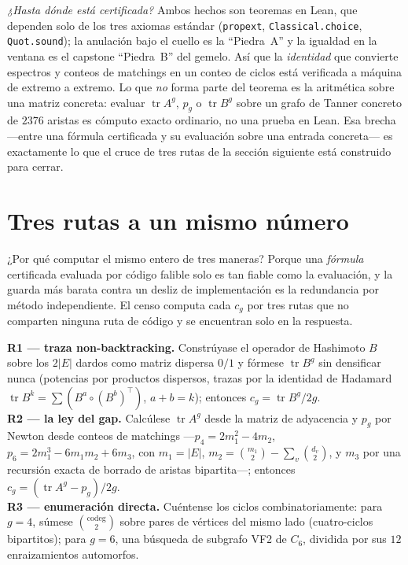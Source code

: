 \documentclass[11pt]{article}
\newcommand{\lean}[1]{\texttt{#1}}
\DeclareMathOperator{\tr}{tr}
\begin{document}
\emph{¿Hasta dónde está certificada?} Ambos hechos son teoremas en Lean, que dependen solo de
los tres axiomas estándar (\lean{propext}, \lean{Classical.choice}, \lean{Quot.sound}); la
anulación bajo el cuello es la ``Piedra~A'' y la igualdad en la ventana es el capstone
``Piedra~B'' del gemelo. Así que la \emph{identidad} que convierte espectros y conteos de
matchings en un conteo de ciclos está verificada a máquina de extremo a extremo. Lo que
\emph{no} forma parte del teorema es la aritmética sobre una matriz concreta: evaluar
$\tr A^g$, $p_g$ o $\tr B^g$ sobre un grafo de Tanner concreto de $2376$ aristas es cómputo
exacto ordinario, no una prueba en Lean. Esa brecha ---entre una fórmula certificada y su
evaluación sobre una entrada concreta--- es exactamente lo que el cruce de tres rutas de la
sección siguiente está construido para cerrar.

\section{Tres rutas a un mismo número}
\label{sec:routes}

¿Por qué computar el mismo entero de tres maneras? Porque una \emph{fórmula} certificada
evaluada por código falible solo es tan fiable como la evaluación, y la guarda más barata
contra un desliz de implementación es la redundancia por método independiente. El censo
computa cada $c_g$ por tres rutas que no comparten ninguna ruta de código y se encuentran
solo en la respuesta.

\begin{tcolorbox}[colframe=ggteal!70,colback=ggband!20,arc=3pt,boxrule=0.8pt,
  title=\textbf{Las tres rutas (mutuamente independientes)},
  coltitle=white,colbacktitle=ggteal]
\textbf{R1 --- traza non-backtracking.} Constrúyase el operador de Hashimoto $B$ sobre los
$2|E|$ dardos como matriz dispersa $0/1$ y fórmese $\tr B^g$ sin densificar nunca (potencias
por productos dispersos, trazas por la identidad de Hadamard $\tr B^k = \sum (B^a \circ
(B^b)^{\!\top})$, $a+b=k$); entonces $c_g = \tr B^g / 2g$.\\[2pt]
\textbf{R2 --- la ley del gap.} Calcúlese $\tr A^g$ desde la matriz de adyacencia y $p_g$ por
Newton desde conteos de matchings ---$p_4 = 2m_1^2 - 4m_2$, $p_6 = 2m_1^3 - 6m_1m_2 + 6m_3$,
con $m_1 = |E|$, $m_2 = \binom{m_1}{2} - \sum_v \binom{d_v}{2}$, y $m_3$ por una recursión
exacta de borrado de aristas bipartita---; entonces $c_g = (\tr A^g - p_g)/2g$.\\[2pt]
\textbf{R3 --- enumeración directa.} Cuéntense los ciclos combinatoriamente: para $g = 4$,
súmese $\binom{\text{codeg}}{2}$ sobre pares de vértices del mismo lado (cuatro-ciclos
bipartitos); para $g = 6$, una búsqueda de subgrafo VF2 de $C_6$, dividida por sus $12$
enraizamientos automorfos.
\end{tcolorbox}
\end{document}
